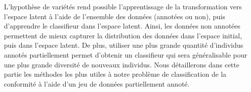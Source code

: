 L'hypothèse de variétés rend possible l'apprentissage de la transformation vers l'espace latent à l'aide de l'ensemble des données (annotées ou non), puis d'apprendre le classifieur dans l'espace latent.
Ainsi, les données non annotées permettent de mieux capturer la distribution des données dans l'espace initial, puis dans l'espace latent.
De plus, utiliser une plus grande quantité d'individus annotés partiellement permet d'obtenir un classifieur qui sera généralisable pour une plus grande diversité de nouveaux individus.
Nous détaillerons dans cette partie les méthodes les plus utiles à notre problème de classification de la conformité à l'aide d'un jeu de données partiellement annoté.

%
